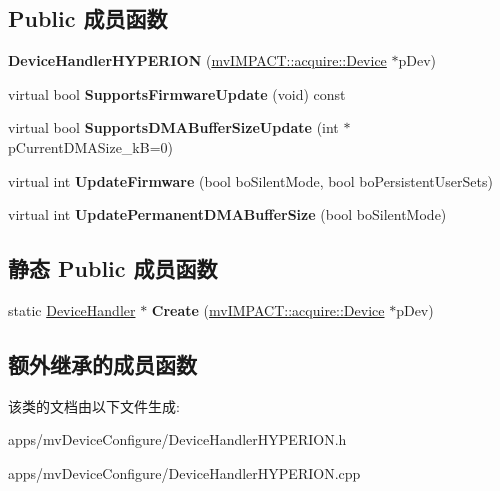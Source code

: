 \subsection*{Public 成员函数}
\begin{DoxyCompactItemize}
\item 
\hypertarget{class_device_handler_h_y_p_e_r_i_o_n_a1a487558f4427372669421c7c27b0370}{{\bfseries Device\+Handler\+H\+Y\+P\+E\+R\+I\+O\+N} (\hyperlink{classmv_i_m_p_a_c_t_1_1acquire_1_1_device}{mv\+I\+M\+P\+A\+C\+T\+::acquire\+::\+Device} $\ast$p\+Dev)}\label{class_device_handler_h_y_p_e_r_i_o_n_a1a487558f4427372669421c7c27b0370}

\item 
\hypertarget{class_device_handler_h_y_p_e_r_i_o_n_afa9c0668455a9d1ca1416c263309ef3f}{virtual bool {\bfseries Supports\+Firmware\+Update} (void) const }\label{class_device_handler_h_y_p_e_r_i_o_n_afa9c0668455a9d1ca1416c263309ef3f}

\item 
\hypertarget{class_device_handler_h_y_p_e_r_i_o_n_a4d2543fcd0dcb99fb0f3861195ecbd9e}{virtual bool {\bfseries Supports\+D\+M\+A\+Buffer\+Size\+Update} (int $\ast$p\+Current\+D\+M\+A\+Size\+\_\+k\+B=0)}\label{class_device_handler_h_y_p_e_r_i_o_n_a4d2543fcd0dcb99fb0f3861195ecbd9e}

\item 
\hypertarget{class_device_handler_h_y_p_e_r_i_o_n_af51cefb32695fd2ce203f1d0db68cd51}{virtual int {\bfseries Update\+Firmware} (bool bo\+Silent\+Mode, bool bo\+Persistent\+User\+Sets)}\label{class_device_handler_h_y_p_e_r_i_o_n_af51cefb32695fd2ce203f1d0db68cd51}

\item 
\hypertarget{class_device_handler_h_y_p_e_r_i_o_n_aa807d6924032bb3899b88db716a0a65e}{virtual int {\bfseries Update\+Permanent\+D\+M\+A\+Buffer\+Size} (bool bo\+Silent\+Mode)}\label{class_device_handler_h_y_p_e_r_i_o_n_aa807d6924032bb3899b88db716a0a65e}

\end{DoxyCompactItemize}
\subsection*{静态 Public 成员函数}
\begin{DoxyCompactItemize}
\item 
\hypertarget{class_device_handler_h_y_p_e_r_i_o_n_a2272ca5b0274119af9cc9ed981eda530}{static \hyperlink{class_device_handler}{Device\+Handler} $\ast$ {\bfseries Create} (\hyperlink{classmv_i_m_p_a_c_t_1_1acquire_1_1_device}{mv\+I\+M\+P\+A\+C\+T\+::acquire\+::\+Device} $\ast$p\+Dev)}\label{class_device_handler_h_y_p_e_r_i_o_n_a2272ca5b0274119af9cc9ed981eda530}

\end{DoxyCompactItemize}
\subsection*{额外继承的成员函数}


该类的文档由以下文件生成\+:\begin{DoxyCompactItemize}
\item 
apps/mv\+Device\+Configure/Device\+Handler\+H\+Y\+P\+E\+R\+I\+O\+N.\+h\item 
apps/mv\+Device\+Configure/Device\+Handler\+H\+Y\+P\+E\+R\+I\+O\+N.\+cpp\end{DoxyCompactItemize}
